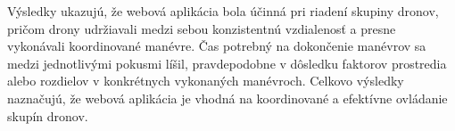 Výsledky ukazujú, že webová aplikácia bola účinná pri riadení skupiny dronov, pričom drony udržiavali medzi sebou konzistentnú vzdialenosť a presne vykonávali koordinované manévre. Čas potrebný na dokončenie manévrov sa medzi jednotlivými pokusmi líšil, pravdepodobne v dôsledku faktorov prostredia alebo rozdielov v konkrétnych vykonaných manévroch. Celkovo výsledky naznačujú, že webová aplikácia je vhodná na koordinované a efektívne ovládanie skupín dronov.